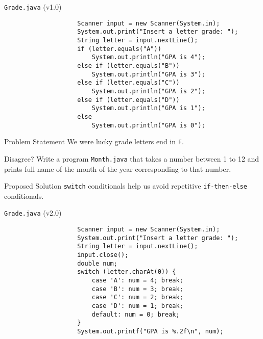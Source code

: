 \documentclass[10pt, compress]{beamer}
\begin{document}
\begin{slide}
	\begin{block}{\texttt{Grade.java} (v1.0)}
		\begin{verbatim}
			        Scanner input = new Scanner(System.in);
			        System.out.print("Insert a letter grade: ");
			        String letter = input.nextLine();
			        if (letter.equals("A"))
			            System.out.println("GPA is 4");
			        else if (letter.equals("B"))
			            System.out.println("GPA is 3");
			        else if (letter.equals("C"))
			            System.out.println("GPA is 2");
			        else if (letter.equals("D"))
			            System.out.println("GPA is 1");
			        else
			            System.out.println("GPA is 0");
		\end{verbatim}
	\end{block}
\end{slide}

\begin{slide}
	\begin{block}{Problem Statement}
		We were lucky grade letters end in \texttt{F}.
	\end{block}
	\begin{block}{Disagree?}
		Write a program \texttt{Month.java} that takes a number between 1 to 12 and prints full name of the month of the year corresponding to that number.
	\end{block}
	\begin{block}{Proposed Solution}
		\texttt{switch} conditionals help us avoid repetitive \texttt{if-then-else} conditionals.
	\end{block}
\end{slide}

\begin{slide}
	\begin{block}{\texttt{Grade.java} (v2.0)}
		\begin{verbatim}
			        Scanner input = new Scanner(System.in);
			        System.out.print("Insert a letter grade: ");
			        String letter = input.nextLine();
			        input.close();
			        double num;
			        switch (letter.charAt(0)) {
			            case 'A': num = 4; break;
			            case 'B': num = 3; break;
			            case 'C': num = 2; break;
			            case 'D': num = 1; break;
			            default: num = 0; break;
			        }
			        System.out.printf("GPA is %.2f\n", num);
		\end{verbatim}
	\end{block}
\end{slide}
\end{document}
